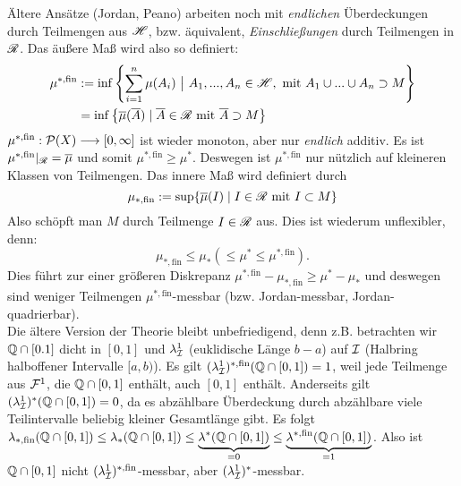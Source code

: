 \begin{small}
\begin{remark}
Ältere Ansätze (Jordan, Peano) arbeiten noch mit \emph{endlichen} Überdeckungen durch Teilmengen aus $\mathscr{H}$, bzw. äquivalent, \emph{Einschließungen} durch Teilmengen in $\mathscr{R}$. Das äußere Maß wird also so definiert:
\begin{equation*}
\begin{split}
\mu^{*,\text{fin}}&:= \inf \left\{ \sum_{i=1}^n \mu(A_i)\  \big\vert \ A_1,...,A_n \in \mathscr{H}, \text{ mit } A_1\cup...\cup A_n \supset M\right\} \\
 &= \inf \left\{ \overline\mu(\overline{A}) \mid \overline{A} \in \mathscr{R} \text{ mit } \overline{A} \supset M \right\}
\end{split}
\end{equation*}
$\mu^{*,\text{fin}}:\mathcal{P}(X)\longrightarrow [0,\infty]$ ist wieder monoton, aber nur \emph{endlich} additiv. Es ist $\mu^{*,\text{fin}}|_{\mathscr{R}}=\overline{\mu}$ und somit $\mu^{*,\text{fin}}\geq \mu^*$. Deswegen ist $\mu^{*,\text{fin}}$ nur nützlich auf kleineren Klassen von Teilmengen. Das innere Maß wird definiert durch
\begin{equation*}
	\mu_{*,\text{fin}}:=\sup \{\overline\mu(I) \mid I \in \mathscr{R} \text{ mit } I \subset M\}
\end{equation*}
Also schöpft man $M$ durch Teilmenge $I\in \mathscr{R}$ aus. Dies ist wiederum unflexibler, denn:
$$
\mu_{*,\text{fin}}\leq \mu_* (\leq \mu^* \leq \mu^{*,\text{fin}}).
$$
Dies führt zur einer größeren Diskrepanz $\mu^{*,\text{fin}}-\mu_{*,\text{fin}}\geq \mu^*-\mu_*$ und deswegen sind weniger Teilmengen $\mu^{*,\text{fin}}$-messbar (bzw. Jordan-messbar, Jordan-quadrierbar).\\
Die ältere Version der Theorie bleibt unbefriedigend, denn z.B. betrachten wir $\mathbb{Q} \cap [0.1]$ dicht in $[0,1]$ und $\lambda^1_{\mathcal{I}}$ (euklidische Länge $b-a$) auf $\mathcal{I}$ (Halbring halboffener Intervalle $[a,b)$). Es gilt $(\lambda_{\mathcal{I}}^1)^{*,\text{fin}}(\mathbb{Q} \cap [0,1])=1$, weil jede Teilmenge aus $\mathcal{F}^1$, die $\mathbb{Q} \cap [0,1]$ enthält, auch $[0,1]$ enthält. Anderseits gilt $(\lambda^1_{\mathcal{I}})^*(\mathbb{Q} \cap [0,1]) =0$, da es abzählbare Überdeckung durch abzählbare viele Teilintervalle beliebig kleiner Gesamtlänge gibt. Es folgt $\lambda_{*,\text{fin}}(\mathbb{Q}\cap[0,1])\leq \lambda_*(\mathbb{Q}\cap[0,1]) \leq \underbrace{\lambda^*(\mathbb{Q}\cap[0,1])}_{=0}\leq \underbrace{\lambda^{*,\text{fin}}(\mathbb{Q}\cap[0,1])}_{=1}$. Also ist $\mathbb{Q}\cap[0,1]$ nicht $(\lambda^1_{\mathcal{I}})^{*,\text{fin}}$-messbar, aber $(\lambda^1_{\mathcal{I}})^*$-messbar.
\end{remark}
\end{small}

